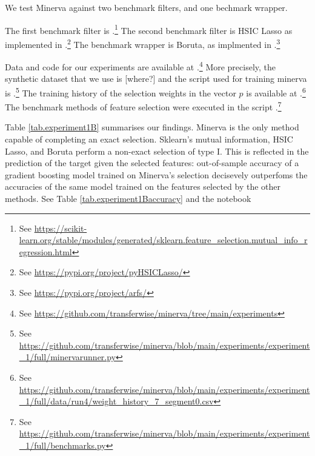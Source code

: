 We test 
Minerva
against two benchmark filters, 
and one bechmark wrapper.

The first benchmark filter is 
.\footnote{
See
\url{https://scikit-learn.org/stable/modules/generated/sklearn.feature\_selection.mutual\_info\_regression.html}
}
The second benchmark filter is
HSIC Lasso
as implemented in 
.\footnote{
See \url{https://pypi.org/project/pyHSICLasso/}
}
The benchmark wrapper is Boruta,
as implmented in
.\footnote{
See
\url{https://pypi.org/project/arfs/}
}


Data and code for our experiments are available 
at
.\footnote{
	See
\url{https://github.com/transferwise/minerva/tree/main/experiments}
}
More precisely, 
the synthetic dataset that we use is
[where?]
and 
the script used for training minerva is
.\footnote{
	See
\url{https://github.com/transferwise/minerva/blob/main/experiments/experiment\_1/full/minervarunner.py}
}
The training history of the 
selection weights
in the vector $p$
is available at
.\footnote{
	See
\url{https://github.com/transferwise/minerva/blob/main/experiments/experiment\_1/full/data/run4/weight\_history\_7\_segment0.csv}
}
The benchmark methods of feature selection 
were
executed
in the script
.\footnote{
	See
\url{https://github.com/transferwise/minerva/blob/main/experiments/experiment\_1/full/benchmarks.py}
}



Table
\ref{tab.experiment1B}
summarises our findings. 
Minerva is the only method capable of completing an exact selection.
Sklearn's mutual information, 
HSIC Lasso,
and 
Boruta
perform a non-exact selection of type I.
This is reflected in the prediction of the target given the selected features:
out-of-sample accuracy of a gradient boosting model
trained on Minerva's selection
decisevely outperfoms
the accuracies of the same model trained on
the features selected by the other methods.
See 
Table \ref{tab.experiment1Baccuracy}
and
the notebook






